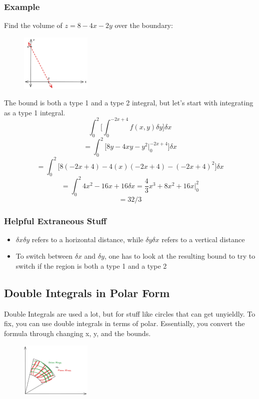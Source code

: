 \documentclass{article}
\begin{document}
\subsubsection{Example}
Find the volume of $z = 8 - 4x - 2y$ over the boundary:
\begin{figure}[H]
    \centering
    \includegraphics[width=0.3\textwidth]{figures/BoundedExample.png}
\end{figure}
The bound is both a type 1 and a type 2 integral, but let's start with integrating as a type 1 integral.
$$\int_{0}^{2} \big[\int_{0}^{-2x+4} f(x, y) \delta y\big] \delta x$$
$$= \int_{0}^{2} \big[8y - 4xy - y^2\big|_0^{-2x+4}\big] \delta x$$
$$= \int_{0}^{2} \big[8(-2x+4) - 4(x)(-2x+4) - (-2x+4)^2\big] \delta x$$
$$= \int_{0}^{2} 4x^2 - 16 x + 16 \delta x = \frac{4}{3} x^3 + 8x^2 + 16x \big|_0^2$$
$$ = \boxed{32/3}$$


\subsubsection{Helpful Extraneous Stuff}
\begin{itemize}
    \item $\delta x \delta y$ refers to a horizontal distance, while $\delta y \delta x$ refers to a vertical distance
    \item To switch between $\delta x$ and $\delta y$, one has to look at the resulting bound to try to switch if the region is both a type 1 and a type 2
\end{itemize}

\subsection{Double Integrals in Polar Form}

Double Integrals are used a lot, but for stuff like circles that can get unyieldly. To fix, you can use double integrals in terms of polar. Essentially, you convert the formula through changing x, y, and the bounds. 

\begin{figure}[H]
    \centering
    \includegraphics[width=0.3\textwidth]{figures/PizzavsOnions.png}
\end{figure}
\end{document}
